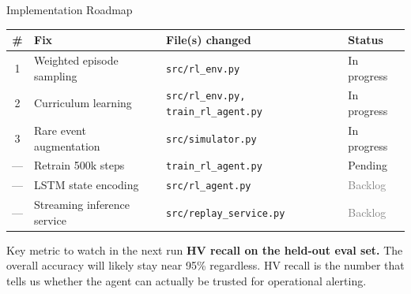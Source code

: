 \documentclass[aspectratio=169,10pt]{beamer}
\begin{document}
\begin{frame}{Implementation Roadmap}
  \begin{tabular}{clll}
    \toprule
    \# & Fix & File(s) changed & Status \\
    \midrule
    1 & Weighted episode sampling &
      \texttt{src/rl\_env.py} &
      \textcolor{warnorange}{In progress} \\
    2 & Curriculum learning &
      \texttt{src/rl\_env.py, train\_rl\_agent.py} &
      \textcolor{warnorange}{In progress} \\
    3 & Rare event augmentation &
      \texttt{src/simulator.py} &
      \textcolor{warnorange}{In progress} \\
    — & Retrain 500k steps &
      \texttt{train\_rl\_agent.py} &
      \textcolor{alertred}{Pending} \\
    — & LSTM state encoding &
      \texttt{src/rl\_agent.py} &
      \textcolor{gray}{Backlog} \\
    — & Streaming inference service &
      \texttt{src/replay\_service.py} &
      \textcolor{gray}{Backlog} \\
    \bottomrule
  \end{tabular}

  \bigskip
  \begin{alertblock}{Key metric to watch in the next run}
    \textbf{HV recall on the held-out eval set.}
    The overall accuracy will likely stay near 95\% regardless.
    HV recall is the number that tells us whether the agent can
    actually be trusted for operational alerting.
  \end{alertblock}
\end{frame}
\end{document}
